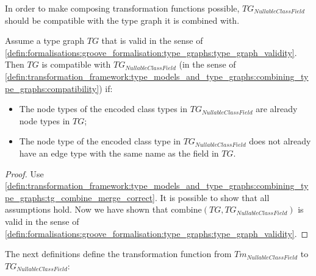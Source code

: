 In order to make composing transformation functions possible, $TG_{NullableClassField}$ should be compatible with the type graph it is combined with.

\begin{thm}
\label{defin:library_of_transformations:type_level_transformations:nullable_class_fields:tg_nullable_class_field_as_edge_type_combine_correct}
Assume a type graph $TG$ that is valid in the sense of \cref{defin:formalisations:groove_formalisation:type_graphs:type_graph_validity}. Then $TG$ is compatible with $TG_{NullableClassField}$ (in the sense of \cref{defin:transformation_framework:type_models_and_type_graphs:combining_type_graphs:compatibility}) if:
\begin{itemize}
    \item The node types of the encoded class types in $TG_{NullableClassField}$ are already node types in $TG$;
    \item The node type of the encoded class type in $TG_{NullableClassField}$ does not already have an edge type with the same name as the field in $TG$.
\end{itemize}
\end{thm}

\begin{proof}
Use \cref{defin:transformation_framework:type_models_and_type_graphs:combining_type_graphs:tg_combine_merge_correct}. It is possible to show that all assumptions hold. Now we have shown that $\mathrm{combine}(TG, TG_{NullableClassField})$ is valid in the sense of \cref{defin:formalisations:groove_formalisation:type_graphs:type_graph_validity}.
\end{proof}

The next definitions define the transformation function from $Tm_{NullableClassField}$ to $TG_{NullableClassField}$:

